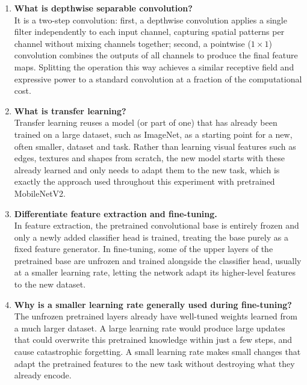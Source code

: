 \documentclass[10pt]{article}
\begin{document}
\begin{enumerate}
\item \textbf{What is depthwise separable convolution?}\\
It is a two-step convolution: first, a depthwise convolution applies a
single filter independently to each input channel, capturing spatial
patterns per channel without mixing channels together; second, a
pointwise ($1\times1$) convolution combines the outputs of all channels
to produce the final feature maps. Splitting the operation this way
achieves a similar receptive field and expressive power to a standard
convolution at a fraction of the computational cost.\\

\item \textbf{What is transfer learning?}\\
Transfer learning reuses a model (or part of one) that has already been
trained on a large dataset, such as ImageNet, as a starting point for a
new, often smaller, dataset and task. Rather than learning visual
features such as edges, textures and shapes from scratch, the new
model starts with these already learned and only needs to adapt them
to the new task, which is exactly the approach used throughout this
experiment with pretrained MobileNetV2.\\

\item \textbf{Differentiate feature extraction and fine-tuning.}\\
In feature extraction, the pretrained convolutional base is entirely
frozen and only a newly added classifier head is trained, treating the
base purely as a fixed feature generator. In fine-tuning, some of the
upper layers of the pretrained base are unfrozen and trained alongside
the classifier head, usually at a smaller learning rate, letting the
network adapt its higher-level features to the new dataset.\\

\item \textbf{Why is a smaller learning rate generally used during fine-tuning?}\\
The unfrozen pretrained layers already have well-tuned weights learned from a much larger dataset. A large learning rate would produce large updates that could overwrite this pretrained knowledge within just a few steps, and cause catastrophic forgetting. A small learning rate makes small changes that adapt the pretrained features to the new task without destroying what they already encode.\\


\end{enumerate}
\end{document}
